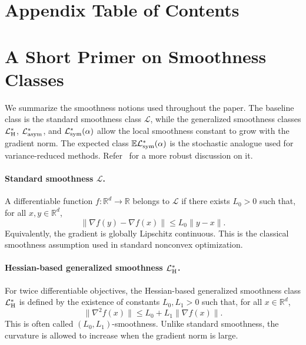 \documentclass[letter,11pt]{article}
\newcommand{\E}{\mathbb{E}}
\newcommand{\R}{\mathbb{R}}
\newcommand{\Lcal}{\mathcal{L}}
\begin{document}
\section*{Appendix Table of Contents}
\startcontents[appendix]

\newpage
\section{A Short Primer on Smoothness Classes}
\label{apdx:primer_smoothness}
We summarize the smoothness notions used throughout the paper. The baseline class is the standard smoothness class $\Lcal$, while the generalized smoothness classes $\Lcal_{\rm H}^*$, $\Lcal_{\rm asym}^*$, and $\Lcal_{\rm sym}^*(\alpha)$ allow the local smoothness constant to grow with the gradient norm. The expected class $\E\Lcal_{\rm sym}^*(\alpha)$ is the stochastic analogue used for variance-reduced methods. Refer~\citet{chen2023generalized} for a more robust discussion on it.

\paragraph{Standard smoothness $\Lcal$.}
A differentiable function $f:\R^d\to\R$ belongs to $\Lcal$ if there exists $L_0>0$ such that, for all $x,y\in\R^d$,
\begin{equation}
    \label{eq:primer_l_smooth}
    \|\nabla f(y)-\nabla f(x)\|
    \le L_0\|y-x\|.
\end{equation}
Equivalently, the gradient is globally Lipschitz continuous. This is the classical smoothness assumption used in standard nonconvex optimization.

\paragraph{Hessian-based generalized smoothness $\Lcal_{\rm H}^*$.}
For twice differentiable objectives, the Hessian-based generalized smoothness class $\Lcal_{\rm H}^*$ is defined by the existence of constants $L_0,L_1>0$ such that, for all $x\in\R^d$,
\begin{equation}
    \label{eq:primer_hessian_gs}
    \|\nabla^2 f(x)\|
    \le L_0 + L_1\|\nabla f(x)\|.
\end{equation}
This is often called $(L_0,L_1)$-smoothness. Unlike standard smoothness, the curvature is allowed to increase when the gradient norm is large.
\end{document}
